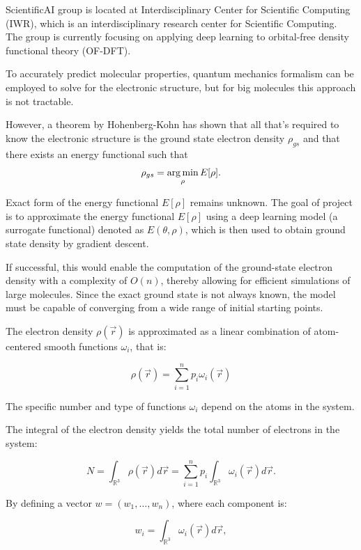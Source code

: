 \documentclass[a4paper,10.5pt]{report}
\begin{document}
ScientificAI group is located at Interdisciplinary Center for Scientific Computing (IWR), which is an interdisciplinary research center for Scientific Computing.
The group is currently focusing on applying deep learning to orbital-free density functional theory (OF-DFT).

 To accurately predict molecular properties, quantum mechanics formalism can be employed to solve for the electronic structure, but for big molecules this approach is not tractable.

However, a theorem by Hohenberg-Kohn has shown that all that's required to know the electronic structure is the ground state electron density $\rho_{gs}$ and that there exists an energy functional such that
\begin{equation*}
 \rho_{gs} = \operatorname*{arg\,min}_\rho E[\rho].
\end{equation*}


Exact form of the energy functional $E[\rho]$ remains unknown. The goal of  project is to approximate the energy functional $E[\rho]$ using a deep learning model (a surrogate functional) denoted as $E(\theta, \rho)$, which is then used to obtain ground state density by gradient descent.

If successful, this would enable the computation of the ground-state electron density with a complexity of $O(n)$, thereby allowing for efficient simulations of large molecules. Since the exact ground state is not always known, the model must be capable of converging from a wide range of initial starting points.

The electron density $\rho(\vec{r})$ is approximated as a linear combination of atom-centered smooth functions $\omega_i$, that is:

\[
\rho(\vec{r}) = \sum_{i=1}^n p_i \omega_i(\vec{r})
\]

The specific number and type of functions $\omega_i$ depend on the atoms in the system.

The integral of the electron density yields the total number of electrons in the system:

\[
N = \int_{\mathbb{R}^3} \rho(\vec{r}) d\vec{r} = \sum_{i=1}^n p_i \int_{\mathbb{R}^3} \omega_i(\vec{r}) d\vec{r}.
\]

By defining a vector $w = (w_1, \ldots, w_n)$, where each component is:

\[
w_i = \int_{\mathbb{R}^3} \omega_i(\vec{r}) d\vec{r},
\]
\end{document}
